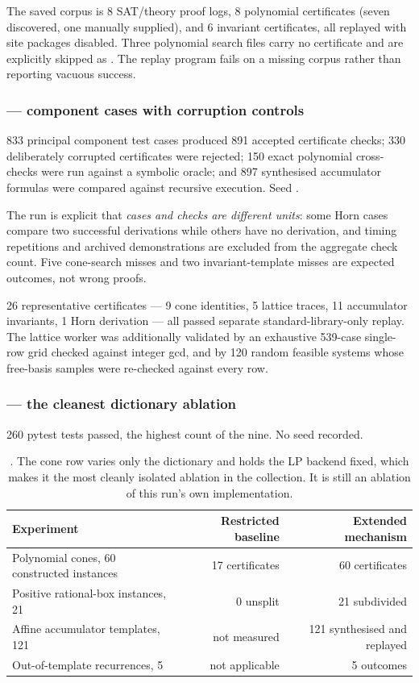 The saved corpus is 8 SAT/theory proof logs, 8 polynomial certificates (seven
discovered, one manually supplied), and 6 invariant certificates, all replayed
with site packages disabled. Three polynomial search files carry no certificate
and are explicitly skipped as \unknown{}. The replay program fails on a missing
corpus rather than reporting vacuous success.

\subsubsection*{ --- component cases with corruption controls}

833 principal component test cases produced 891 accepted certificate checks;
330 deliberately corrupted certificates were rejected; 150 exact polynomial
cross-checks were run against a symbolic oracle; and 897 synthesised accumulator
formulas were compared against recursive execution. Seed .

The run is explicit that \emph{cases and checks are different units}: some Horn
cases compare two successful derivations while others have no derivation, and
timing repetitions and archived demonstrations are excluded from the aggregate
check count. Five cone-search misses and two invariant-template misses are
expected outcomes, not wrong proofs.

26 representative certificates --- 9 cone identities, 5 lattice traces, 11
accumulator invariants, 1 Horn derivation --- all passed separate
standard-library-only replay. The lattice worker was additionally validated by
an exhaustive 539-case single-row grid checked against integer gcd, and by 120
random feasible systems whose free-basis samples were re-checked against every
row.

\subsubsection*{ --- the cleanest dictionary ablation}

260 pytest tests passed, the highest count of the nine. No seed recorded.

\begin{table}[htbp]
\centering\small
\begin{tabular}{@{}lrr@{}}
\toprule
Experiment & Restricted baseline & Extended mechanism \\
\midrule
Polynomial cones, 60 constructed instances & 17 certificates & 60 certificates \\
Positive rational-box instances, 21 & 0 unsplit & 21 subdivided \\
Affine accumulator templates, 121 & not measured & 121 synthesised and replayed \\
Out-of-template recurrences, 5 & not applicable & 5 \unknown{} outcomes \\
\bottomrule
\end{tabular}
\caption{. The cone row varies only the dictionary and holds the LP
backend fixed, which makes it the most cleanly isolated ablation in the
collection. It is still an ablation of this run's own implementation.}
\label{tab:p8}
\end{table}

